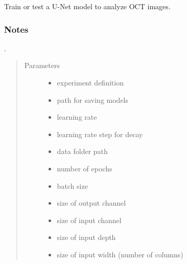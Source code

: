\documentclass[letterpaper,10pt,english]{sphinxmanual}
\begin{document}
\begin{fulllineitems}
\label{\detokenize{index:train.main}}
Train or test a U-Net model to analyze OCT images.
\subsubsection*{Notes}

.
\begin{quote}\begin{description}
\item[{Parameters}] \leavevmode\begin{itemize}
\item {} 
 \textendash{} experiment definition

\item {} 
 \textendash{} path for saving models

\item {} 
 \textendash{} learning rate

\item {} 
 \textendash{} learning rate step for decay

\item {} 
 \textendash{} data folder path

\item {} 
 \textendash{} number of epochs

\item {} 
 \textendash{} batch size

\item {} 
 \textendash{} size of output channel

\item {} 
 \textendash{} size of input channel

\item {} 
 \textendash{} size of input depth

\item {} 
 \textendash{} size of input width (number of columns)


\end{itemize}
\end{description}
\end{quote}
\end{fulllineitems}
\end{document}
